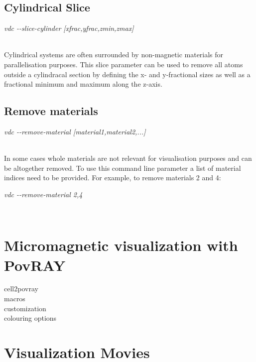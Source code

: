\subsection*{Cylindrical Slice}

\begin{minipage}[c]{\textwidth}
\centering
\textit{vdc -{}-slice-cylinder [xfrac,yfrac,zmin,zmax]}
\end{minipage}\\

Cylindrical systems are often surrounded by non-magnetic materials for parallelisation purposes. This slice parameter can be used to remove all atoms outside a cylindracal section by defining the x- and y-fractional sizes as well as a fractional minimum and maximum along the z-axis.

\subsection*{Remove materials}

\begin{minipage}[c]{\textwidth}
\centering
\textit{vdc -{}-remove-material [material1,material2,...]}
\end{minipage}\\

In some cases whole materials are not relevant for visualisation purposes and can be altogether removed. To use this command line parameter a list of material indices need to be provided. For example, to remove materials 2 and 4:

\begin{minipage}[c]{\textwidth}
\centering
\textit{vdc -{}-remove-material 2,4}
\end{minipage}\\

\section*{Micromagnetic visualization with PovRAY}
cell2povray\\
macros\\
customization\\
colouring options\\

\section*{Visualization Movies}
